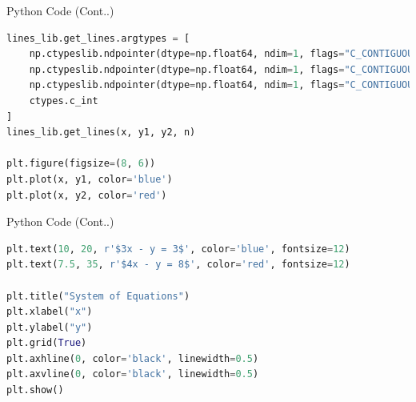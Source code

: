 \documentclass{beamer}
\begin{document}
\begin{frame}[fragile]{Python Code (Cont..)}
\begin{lstlisting}[language=Python]
lines_lib.get_lines.argtypes = [
    np.ctypeslib.ndpointer(dtype=np.float64, ndim=1, flags="C_CONTIGUOUS"),
    np.ctypeslib.ndpointer(dtype=np.float64, ndim=1, flags="C_CONTIGUOUS"),
    np.ctypeslib.ndpointer(dtype=np.float64, ndim=1, flags="C_CONTIGUOUS"),
    ctypes.c_int
]
lines_lib.get_lines(x, y1, y2, n)

plt.figure(figsize=(8, 6))
plt.plot(x, y1, color='blue')
plt.plot(x, y2, color='red')
\end{lstlisting}
\end{frame}

\begin{frame}[fragile]{Python Code (Cont..)}
\begin{lstlisting}[language=Python]
plt.text(10, 20, r'$3x - y = 3$', color='blue', fontsize=12)
plt.text(7.5, 35, r'$4x - y = 8$', color='red', fontsize=12)

plt.title("System of Equations")
plt.xlabel("x")
plt.ylabel("y")
plt.grid(True)
plt.axhline(0, color='black', linewidth=0.5)
plt.axvline(0, color='black', linewidth=0.5)
plt.show()
\end{lstlisting}
\end{frame}
\end{document}
